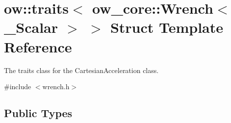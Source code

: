 \hypertarget{structow_1_1traits_3_01ow__core_1_1Wrench_3_01__Scalar_01_4_01_4}{}\section{ow\+:\+:traits$<$ ow\+\_\+core\+:\+:Wrench$<$ \+\_\+\+Scalar $>$ $>$ Struct Template Reference}
\label{structow_1_1traits_3_01ow__core_1_1Wrench_3_01__Scalar_01_4_01_4}


The traits class for the Cartesian\+Acceleration class.  




{\ttfamily \#include $<$wrench.\+h$>$}

\subsection*{Public Types}
